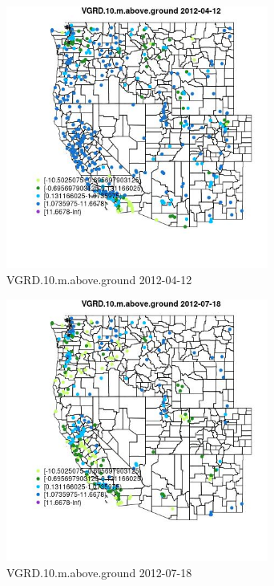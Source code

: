 \begin{figure} 
\centering  
\includegraphics[width=0.77\textwidth]{Code_Outputs/Report_ML_input_PM25_Step4_part_e_de_duplicated_aves_compiled_2019-05-14wNAs_MapObsVGRD10maboveground2012-04-12.jpg} 
\caption{\label{fig:Report_ML_input_PM25_Step4_part_e_de_duplicated_aves_compiled_2019-05-14wNAsMapObsVGRD10maboveground2012-04-12}VGRD.10.m.above.ground 2012-04-12} 
\end{figure} 
 

\clearpage 

\begin{figure} 
\centering  
\includegraphics[width=0.77\textwidth]{Code_Outputs/Report_ML_input_PM25_Step4_part_e_de_duplicated_aves_compiled_2019-05-14wNAs_MapObsVGRD10maboveground2012-07-18.jpg} 
\caption{\label{fig:Report_ML_input_PM25_Step4_part_e_de_duplicated_aves_compiled_2019-05-14wNAsMapObsVGRD10maboveground2012-07-18}VGRD.10.m.above.ground 2012-07-18} 
\end{figure} 
 

